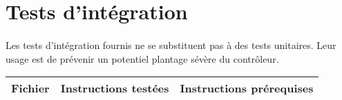 \section{Tests d'intégration}

\renewcommand\tabularxcolumn[1]{m{#1}}%

\paragraph{}
Les tests d'intégration fournis ne se substituent pas à des tests unitaires. Leur usage est de prévenir un potentiel plantage sévère du contrôleur.


\begin{tabularx}{\textwidth}{|l|X|X|}
\hline 
\textbf{Fichier} & \textbf{Instructions testées} & \textbf{Instructions prérequises}\\
\hline


\end{tabularx}
